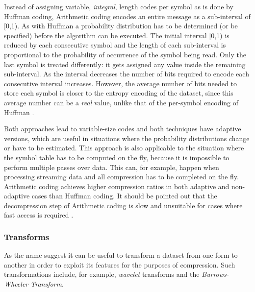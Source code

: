 Instead of assigning variable, \textit{integral}, length codes per symbol as is done by Huffman coding, Arithmetic coding encodes an entire message as a sub-interval of [0,1). As with
Huffman a probability distribution has to be determined (or be specified) before the algorithm can be executed. The initial interval [0,1) is reduced by each consecutive 
symbol and the length of each sub-interval is proportional to the probability of occurrence of the symbol being read. Only the last symbol is treated differently: it gets assigned any value inside the remaining 
sub-interval. As the interval decreases the number of bits required to encode each consecutive interval increases. However, the average number of bits needed to store 
each symbol is closer to the entropy encoding of the dataset, since this average number can be a \textit{real} value, unlike that of the per-symbol encoding of Huffman \cite[ch. 2]{salomon2004data}.

Both approaches lead to variable-size codes and both techniques have adaptive versions, which are useful in situations where the probability distributions change or have to be estimated. 
This approach is also applicable to the situation where the symbol table has to be computed on the fly, because it is impossible to perform multiple passes over data. This can, for example,
happen when processing streaming data and all compression has to be completed on the fly. Arithmetic coding achieves higher compression ratios in both adaptive and non-adaptive cases 
than Huffman coding. It should be pointed out that the decompression step of Arithmetic coding is slow and unsuitable for cases where fast access is 
required \cite{ray1995database,williams1999compressing}\cite[ch. 2]{salomon2004data}.
\subsubsection{Transforms}
As the name suggest it can be useful to transform a dataset from one form to another in order to exploit its features for the purposes of compression. Such transformations 
include, for example, \textit{wavelet} transforms and the \textit{Burrows-Wheeler Transform}. 

